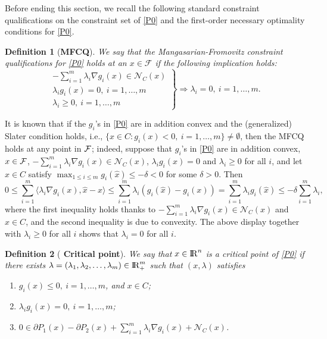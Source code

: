 \documentclass[10pt]{article}
\numberwithin{equation}{section}
\newtheorem{definition}{Definition}[section]
\def\R{{\rm I\!R}}
\begin{document}
Before ending this section, we recall the following standard constraint qualifications on the constraint set of \eqref{P0} and the first-order necessary optimality conditions for \eqref{P0}.
\begin{definition}[{{\bf MFCQ}}]\label{MFCQ1}
We say that the Mangasarian-Fromovitz constraint qualifications for \eqref{P0} holds at an $x\in \mathcal{F}$ if the following implication holds:
\[
\left.\begin{matrix}
-\sum\limits_{i=1}^m\lambda_i \nabla g_i(x)\in \mathcal{N}_C(x)\\
\lambda_ig_i(x) =0, ~ i = 1, \ldots, m\\
\lambda_i\geq 0, ~ i = 1, \ldots, m
\end{matrix}\right\} \Rightarrow\lambda_i =0, ~ i = 1,\ldots, m.
\]
\end{definition}
{\color{black} It is known that if the $g_i$'s in \eqref{P0} are in addition convex and the (generalized) Slater condition holds, i.e., $\{x \in C: g_i(x) < 0, ~ i = 1, \ldots, m\} \neq \emptyset $, then the MFCQ holds at any point in ${\cal F}$; indeed, suppose that $g_i$'s in \eqref{P0} are in addition convex, $x\in {\cal F}$, $-\sum\limits_{i=1}^m\lambda_i \nabla g_i(x)\in \mathcal{N}_C(x)$, $\lambda_ig_i(x) =0$ and
$\lambda_i\geq 0$ for all $i$, and let $\hat x\in C$ satisfy $\max_{1\le i\le m}g_i(\hat x) \le -\delta < 0$ for some $\delta > 0$. Then
\[
0 \le \sum_{i=1}^m\langle \lambda_i \nabla g_i(x), \hat x - x\rangle\le \sum_{i=1}^m\lambda_i(g_i(\hat x) - g_i(x)) = \sum_{i=1}^m\lambda_ig_i(\hat x)\le -\delta\sum_{i=1}^m\lambda_i,
\]
where the first inequality holds thanks to $-\sum\limits_{i=1}^m\lambda_i \nabla g_i(x)\in \mathcal{N}_C(x)$ and $\hat x\in C$, and the second inequality is due to convexity.
The above display together with $\lambda_i \ge 0$ for all $i$ shows that $\lambda_i = 0$ for all $i$.
}
\begin{definition}[{{\bf {\color{black} Critical point}}}]\label{Stationary}
We say that $x\in\R^n$ is a {\color{black}critical point} of \eqref{P0} if there exists $\lambda = (\lambda_1, \lambda_2, \ldots, \lambda_m)\in\R_+^m$ such that $(x,\lambda)$ satisfies
 \begin{enumerate}[{\rm (i)}]
   \item $g_i(x) \leq 0, ~ i = 1, \ldots, m$, and $x\in C$;
   \item $\lambda_ig_i(x)=0, ~ i = 1, \ldots, m$;
   \item $0\in\partial P_1(x) - \partial P_2(x) + \sum\limits_{i=1}^m\lambda_i \nabla g_i(x) + \mathcal{N}_C(x)$.
 \end{enumerate}
\end{definition}
\end{document}
